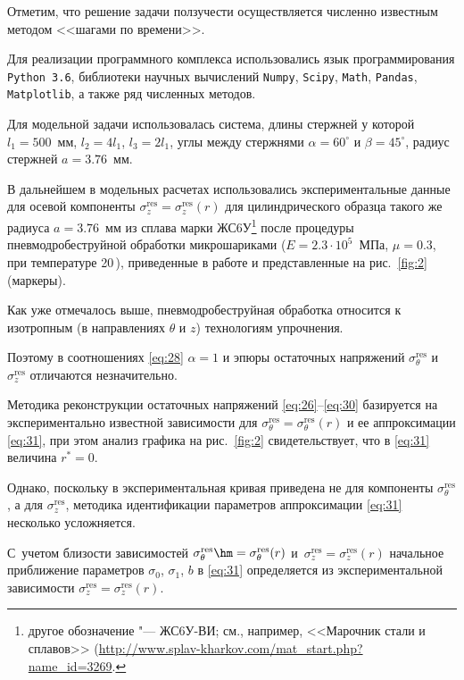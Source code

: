 Отметим, что решение задачи ползучести осуществляется численно известным методом <<шагами по времени>>.



Для реализации программного комплекса использовались язык программирования {\tt Python 3.6}, библиотеки научных вычислений {\tt Numpy}, {\tt Scipy}, {\tt Math}, {\tt Pandas}, {\tt Matplotlib}, а также ряд численных методов.



Для модельной задачи использовалась система, длины стержней у которой $l_1 = 500$~мм, $l_2 = 4 l_1$, $l_3 = 2 l_1$, углы между стержнями $\alpha = 60^\circ$ и $\beta = 45^\circ$, радиус стержней $a = 3.76$~мм.

В дальнейшем в модельных расчетах использовались экспериментальные данные для осевой компоненты $\sigma_z^{\text{res}} = \sigma_z^{\text{res}} (r)$ для цилиндрического образца такого же радиуса $a = 3.76$~мм из сплава марки ЖС6У\footnote{другое обозначение "--- ЖС6У-ВИ; см., например, <<Марочник стали и сплавов>> (\url{http://www.splav-kharkov.com/mat_start.php?name_id=3269}.}  \!\! после процедуры пневмодробеструйной обработки микрошариками ($E = 2.3 \cdot 10^5$~МПа, $\mu = 0.3$, при температуре 20\,\textcelsius), приведенные в работе \cite{25-Radchenko-Saushkin-Tsventov-2016} и представленные на рис.~\ref{fig:2} (маркеры).

Как уже отмечалось выше, пневмодробеструйная обработка относится к изотропным (в направлениях $\theta$ и $z$) технологиям упрочнения.

Поэтому в соотношениях \eqref{eq:28} $\alpha = 1$ и эпюры остаточных напряжений $\sigma_\theta^{\text{res}}$ и~$\sigma_z^{\text{res}}$ отличаются незначительно.

Методика реконструкции остаточных напряжений \eqref{eq:26}--\eqref{eq:30} базируется на экспериментально известной зависимости для $\sigma_\theta^{\text{res}} = \sigma_\theta^{\text{res}} (r)$ и ее аппроксимации \eqref{eq:31}, при этом анализ графика на рис.~\ref{fig:2} свидетельствует, что в \eqref{eq:31} величина $r^{\ast}=0$.





Однако, поскольку в \cite{25-Radchenko-Saushkin-Tsventov-2016} экспериментальная кривая приведена не для компоненты $\sigma_\theta^{\text{res}}$, а для $\sigma_z^{\text{res}}$, методика идентификации параметров аппроксимации \eqref{eq:31} несколько усложняется. 

С~учетом близости зависимостей $\sigma_\theta^{\text{res}} \hm = \sigma_\theta^{\text{res}} (r)$ и~$\sigma_z^{\text{res}} = \sigma_z^{\text{res}} (r)$ начальное приближение параметров $\sigma_0$, $\sigma_1$, $b$ в \eqref{eq:31} определяется из экспериментальной зависимости $\sigma_z^{\text{res}} = \sigma_z^{\text{res}} (r)$.

